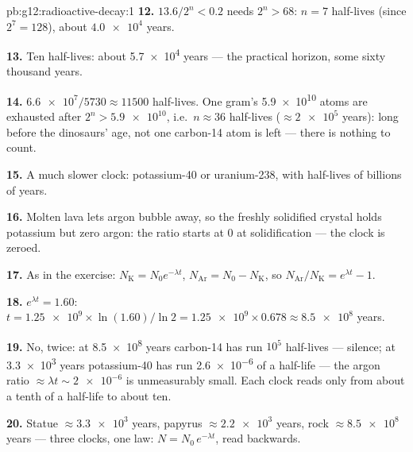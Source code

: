 \begin{solution}{pb:g12:radioactive-decay:1}
\textbf{12.} $13.6/2^n < 0.2$ needs $2^n > 68$: $n = 7$ half-lives
(since $2^7 = 128$), about $\num{4.0e4}$ years.

\textbf{13.} Ten half-lives: about \num{5.7e4} years --- the
practical horizon, some sixty thousand years.

\textbf{14.} $\num{6.6e7}/\num{5730} \approx \num{11500}$ half-lives.
One gram's \num{5.9e10} atoms are exhausted after
$2^n > \num{5.9e10}$, i.e.\ $n \approx 36$ half-lives
($\approx \num{2e5}$ years): long before the dinosaurs' age, not one
carbon-14 atom is left --- there is nothing to count.

\textbf{15.} A much slower clock: potassium-40 or uranium-238, with
half-lives of billions of years.

\textbf{16.} Molten lava lets argon bubble away, so the freshly
solidified crystal holds potassium but zero argon: the ratio starts
at $0$ at solidification --- the clock is zeroed.

\textbf{17.} As in the exercise: $N_{\mathrm K} = N_0 e^{-\lambda t}$,
$N_{\mathrm{Ar}} = N_0 - N_{\mathrm K}$, so
$N_{\mathrm{Ar}}/N_{\mathrm K} = e^{\lambda t} - 1$.

\textbf{18.} $e^{\lambda t} = 1.60$:
$t = \num{1.25e9} \times \ln(1.60)/\ln 2 = \num{1.25e9} \times 0.678
\approx \num{8.5e8}$ years.

\textbf{19.} No, twice: at \num{8.5e8} years carbon-14 has run
$10^5$ half-lives --- silence; at \num{3.3e3} years potassium-40 has
run \num{2.6e-6} of a half-life --- the argon ratio
$\approx \lambda t \sim \num{2e-6}$ is unmeasurably small. Each
clock reads only from about a tenth of a half-life to about ten.

\textbf{20.} Statue $\approx \num{3.3e3}$ years, papyrus
$\approx \num{2.2e3}$ years, rock $\approx \num{8.5e8}$ years ---
three clocks, one law: $N = N_0\,e^{-\lambda t}$, read backwards.
\end{solution}

